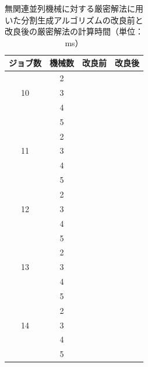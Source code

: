 \documentclass[12pt]{optlab-bachelor}
\begin{document}
\begin{table}[htb]
  \begin{center}
    \begin{tabular}{|c|c|c|c|} \hline
      ジョブ数 & 機械数 & 改良前 & 改良後 \\ \hline \hline
      & 2 &  &   \\ \cline{2-4}
      10 & 3 &  &   \\ \cline{2-4}
      & 4 &  &   \\ \cline{2-4}
      & 5 &  &   \\ \hline \hline
      & 2 &  &   \\ \cline{2-4}
      11 & 3 &  &  \\ \cline{2-4}
      & 4 &  &   \\ \cline{2-4}
      & 5 &  &   \\ \hline \hline
      & 2 &  &   \\ \cline{2-4}
      12 & 3 &  &   \\ \cline{2-4}
      & 4 &  &  \\ \cline{2-4}
      & 5 &  &    \\ \hline \hline
      & 2 &  &  \\ \cline{2-4}
      13 & 3 &  &  \\ \cline{2-4}
      & 4 &  &  \\ \cline{2-4}
      & 5 &  &  \\ \hline \hline
      & 2 &  &  \\ \cline{2-4}
      14 & 3 &  &  \\ \cline{2-4}
      & 4 &  &  \\ \cline{2-4}
      & 5 &  &   \\ \hline \hline
    \end{tabular}
    \caption{無関連並列機械に対する厳密解法に用いた分割生成アルゴリズムの改良前と改良後の厳密解法の計算時間（単位：ms）}
    \label{A3}
  \end{center}
\end{table}
\end{document}
